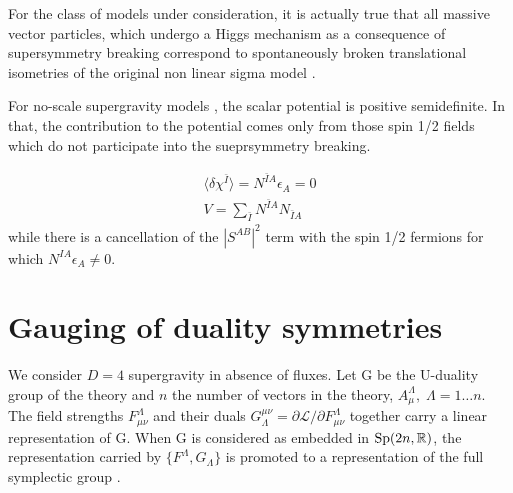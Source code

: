 \documentclass[a4paper,12pt]{article}
\begin{document}
For the class of models under consideration, it is actually true that all massive vector particles, which 
undergo a Higgs 
mechanism as a consequence of supersymmetry breaking correspond to spontaneously broken translational isometries of 
the 
original non linear sigma model \cite{adfl2,adfl3}. 

For no-scale supergravity models \cite{cfkn,elnt}, the scalar potential is positive semidefinite. In that, the 
contribution to the 
potential comes only from those spin 1/2 fields which do not participate into the sueprsymmetry breaking.

\begin{eqnarray*}\langle \delta\chi^{\bar I}\rangle=N^{\bar I A}\epsilon_A=0\\
V=\sum_{\bar I} N^{\bar I A}N_{\bar I A}\end{eqnarray*}
while there is a cancellation of the $|S^{AB}|^2$ term with the spin 1/2 fermions for which 
$N^{IA}\epsilon_A\neq0$.

\section{Gauging of duality symmetries}


We consider  $D=4$ supergravity  in absence of fluxes. Let G be
the U-duality group of the theory and  $n$ the number of vectors
in the theory, $A_\mu^\Lambda,\; \Lambda=1\dots n$.  The field
strengths $F^\Lambda_{\mu\nu}$ and their duals
$G_\Lambda^{\mu\nu}=\partial\mathcal{L}/\partial
F^\Lambda_{\mu\nu}$ together carry a linear representation of  G.
When G is considered as embedded in $\mathrm{Sp}(2n, \mathbb{R})$, the
representation carried by $\{F^\Lambda, G_\Lambda\}$ is promoted
to a representation of the full symplectic group \cite{gz}.
\end{document}
